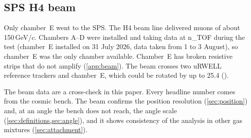 \subsection{SPS H4 beam}
Only chamber~E went to the SPS. The H4 beam line delivered muons of about 150\,GeV/$c$.
Chambers A--D were installed and taking data at n\_TOF during the test (chamber~E installed on 31 July 2026, data taken from 1 to 3 August), so chamber~E was the only chamber available. Chamber~E has broken resistive strips that do not amplify
(\cref{app:beam}). The beam crosses two uRWELL reference trackers and chamber~E, which could be
rotated by up to 25.4\textdegree{} ().

The beam data are a cross-check in this paper. Every headline number comes from the cosmic bench. The beam confirms
the position resolution (\cref{sec:position}) and, at an angle the bench does not reach, the angle scale
(\cref{sec:definitions,sec:angle}), and it shows consistency of the analysis in other gas mixtures (\cref{sec:attachment}).


